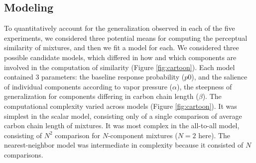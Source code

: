\subsection*{Modeling}
\label{sec:results_modeling}
To quantitatively account for the generalization observed in each of the five experiments, we considered three potential means for computing the perceptual similarity of mixtures, and then we fit a model for each.  
We considered three possible candidate models, which differed in how and which components are involved in the computation of similarity (Figure \ref{fig:cartoon}).  
Each model contained 3 parameters: the baseline response probability ($p0$), and the salience of individual components according to vapor pressure ($\alpha$), the steepness of generalization for components differing in carbon chain length ($\beta$).  
The computational complexity varied across models (Figure \ref{fig:cartoon}).  It was simplest in the scalar model, consisting only of a single comparison of average carbon chain length of mixtures.  It was most complex in the all-to-all model, consisting of $N^2$ comparison for $N$-component mixtures ($N=2$ here).  The nearest-neighbor model was intermediate in complexity because it consisted of $N$ comparisons.  